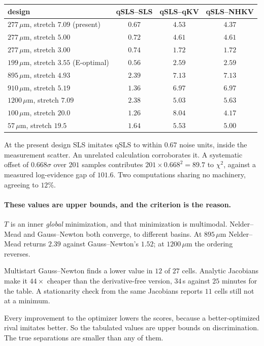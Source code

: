 \documentclass[10pt]{article}
\begin{document}
\begin{center}
\begin{tabular}{lccc}
\toprule
design & qSLS--SLS & qSLS--qKV & qSLS--NHKV \\
\midrule
$277\,\mu$m, stretch $7.09$ (present) & $0.67$ & $4.53$ & $4.37$ \\
$277\,\mu$m, stretch $5.00$ & $0.72$ & $4.61$ & $4.61$ \\
$277\,\mu$m, stretch $3.00$ & $0.74$ & $1.72$ & $1.72$ \\
$199\,\mu$m, stretch $3.55$ (E-optimal) & $0.56$ & $2.59$ & $2.59$ \\
$895\,\mu$m, stretch $4.93$ & $\mathbf{2.39}$ & $7.13$ & $\mathbf{7.13}$ \\
$910\,\mu$m, stretch $5.19$ & $1.36$ & $6.97$ & $6.97$ \\
$1200\,\mu$m, stretch $7.09$ & $2.38$ & $5.03$ & $5.63$ \\
$100\,\mu$m, stretch $20.0$ & $1.26$ & $\mathbf{8.04}$ & $4.17$ \\
$57\,\mu$m, stretch $19.5$ & $1.64$ & $5.53$ & $5.00$ \\
\bottomrule
\end{tabular}
\end{center}

At the present design SLS imitates qSLS to within $0.67$ noise units, inside the measurement
scatter. An unrelated calculation corroborates it. A systematic offset of $0.668\sigma$ over
$201$ samples contributes $201 \times 0.668^2 = 89.7$ to $\chi^2$, against a measured
log-evidence gap of $101.6$. Two computations sharing no machinery, agreeing to $12\%$.

\paragraph{These values are upper bounds, and the criterion is the reason.}
$T$ is an inner \emph{global} minimization, and that minimization is multimodal.
Nelder--Mead and Gauss--Newton both converge, to different basins. At $895\,\mu$m
Nelder--Mead returns $2.39$ against Gauss--Newton's $1.52$; at $1200\,\mu$m the ordering
reverses.

Multistart Gauss--Newton finds a lower value in $12$ of $27$ cells. Analytic Jacobians make
it $44\times$ cheaper than the derivative-free version, $34$\,s against $25$ minutes for
the table. A stationarity check from the same Jacobians reports $11$ cells still not at a
minimum.

Every improvement to the optimizer lowers the scores, because a better-optimized rival
imitates better. So the tabulated values are upper bounds on discrimination. The true
separations are smaller than any of them.
\end{document}
